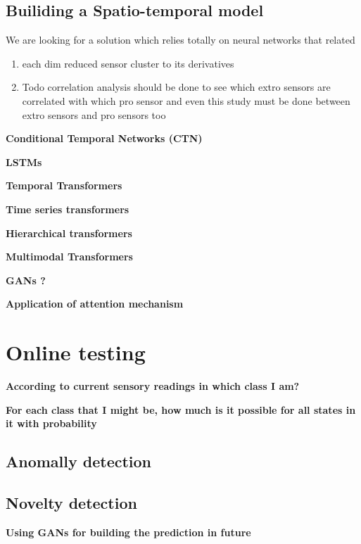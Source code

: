     \subsection{Builiding a Spatio-temporal model}
        We are looking for a solution which relies totally on neural networks that related
        \begin{enumerate}
            \item each dim reduced sensor cluster to its derivatives
            \item Todo correlation analysis should be done to see which extro sensors are correlated with which pro sensor and even this study must be done between extro sensors and pro sensors too
        \end{enumerate}
        
        \textbf{Conditional Temporal Networks (CTN)}

        \textbf{LSTMs}

        \textbf{Temporal Transformers}

        \textbf{Time series transformers}

        \textbf{Hierarchical transformers}

        \textbf{Multimodal Transformers}
        
        \textbf{GANs ?}

        \textbf{Application of attention mechanism}                                         

\section{Online testing}
    \textbf{According to current sensory readings in which class I am?}
    
    \textbf{For each class that I might be, how much is it possible for all states in it with probability}
    
    \subsection{Anomally detection}
    
    \subsection{Novelty detection}
        \textbf{Using GANs for building the prediction in future}